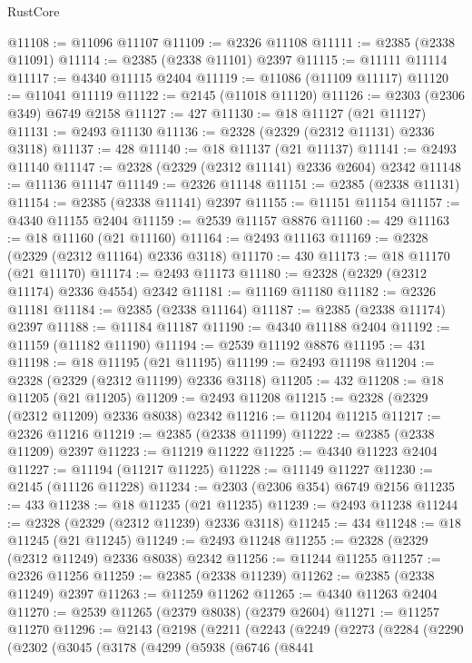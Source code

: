 \begin{lexlean}{RustCore}
\begin{coremodule}
@11108 := @11096 @11107
@11109 := @2326 @11108
@11111 := @2385 (@2338 @11091)
@11114 := @2385 (@2338 @11101) @2397
@11115 := @11111 @11114
@11117 := @4340 @11115 @2404
@11119 := @11086 (@11109 @11117)
@11120 := @11041 @11119
@11122 := @2145 (@11018 @11120)
@11126 := @2303 (@2306 @349) @6749 @2158
@11127 := 427
@11130 := @18 @11127 (@21 @11127)
@11131 := @2493 @11130
@11136 := @2328 (@2329 (@2312 @11131) @2336 @3118)
@11137 := 428
@11140 := @18 @11137 (@21 @11137)
@11141 := @2493 @11140
@11147 := @2328 (@2329 (@2312 @11141) @2336 @2604) @2342
@11148 := @11136 @11147
@11149 := @2326 @11148
@11151 := @2385 (@2338 @11131)
@11154 := @2385 (@2338 @11141) @2397
@11155 := @11151 @11154
@11157 := @4340 @11155 @2404
@11159 := @2539 @11157 @8876
@11160 := 429
@11163 := @18 @11160 (@21 @11160)
@11164 := @2493 @11163
@11169 := @2328 (@2329 (@2312 @11164) @2336 @3118)
@11170 := 430
@11173 := @18 @11170 (@21 @11170)
@11174 := @2493 @11173
@11180 := @2328 (@2329 (@2312 @11174) @2336 @4554) @2342
@11181 := @11169 @11180
@11182 := @2326 @11181
@11184 := @2385 (@2338 @11164)
@11187 := @2385 (@2338 @11174) @2397
@11188 := @11184 @11187
@11190 := @4340 @11188 @2404
@11192 := @11159 (@11182 @11190)
@11194 := @2539 @11192 @8876
@11195 := 431
@11198 := @18 @11195 (@21 @11195)
@11199 := @2493 @11198
@11204 := @2328 (@2329 (@2312 @11199) @2336 @3118)
@11205 := 432
@11208 := @18 @11205 (@21 @11205)
@11209 := @2493 @11208
@11215 := @2328 (@2329 (@2312 @11209) @2336 @8038) @2342
@11216 := @11204 @11215
@11217 := @2326 @11216
@11219 := @2385 (@2338 @11199)
@11222 := @2385 (@2338 @11209) @2397
@11223 := @11219 @11222
@11225 := @4340 @11223 @2404
@11227 := @11194 (@11217 @11225)
@11228 := @11149 @11227
@11230 := @2145 (@11126 @11228)
@11234 := @2303 (@2306 @354) @6749 @2156
@11235 := 433
@11238 := @18 @11235 (@21 @11235)
@11239 := @2493 @11238
@11244 := @2328 (@2329 (@2312 @11239) @2336 @3118)
@11245 := 434
@11248 := @18 @11245 (@21 @11245)
@11249 := @2493 @11248
@11255 := @2328 (@2329 (@2312 @11249) @2336 @8038) @2342
@11256 := @11244 @11255
@11257 := @2326 @11256
@11259 := @2385 (@2338 @11239)
@11262 := @2385 (@2338 @11249) @2397
@11263 := @11259 @11262
@11265 := @4340 @11263 @2404
@11270 := @2539 @11265 (@2379 @8038) (@2379 @2604)
@11271 := @11257 @11270
@11296 := @2143
    (@2198
      (@2211
        (@2243
          (@2249
            (@2273
              (@2284
                (@2290
                  (@2302
                    (@3045
                      (@3178
                        (@4299
                          (@5938
                            (@6746
                              (@8441

\end{coremodule}
\end{lexlean}
